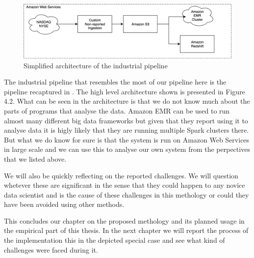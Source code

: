 \begin{figure}[ht!]
    \includegraphics[scale=0.50]{images/example2} 
    \centering
    \caption{Simplified architecture of the industrial pipeline}
\end{figure}

The industrial pipeline that resembles the most of our pipeline here is the pipeline recaptured in \cite{snively}.
The high level architecture shown is presented in Figure 4.2.
What can be seen in the architecture is that we do not know much about the parts of programs that analyse the data.
Amazon EMR can be used to run almost many different big data frameworks but given that they report using it to analyse data it is higly likely that they are running multiple Spark clusters there.
But what we do know for sure is that the system is run on Amazon Web Services in large scale and we can use this to analyse our own system from the perpectives that we listed above.


We will also be quickly reflecting on the reported challenges.
We will question whetever these are significant in the sense that they could happen to any novice data scientist and is the cause of these challenges in this methology or could they have been avoided using other methods.

This concludes our chapter on the proposed methology and its planned usage in the empirical part of this thesis.%
In the next chapter we will report the process of the implementation this in the depicted special case and see what kind of challenges were faced during it.



